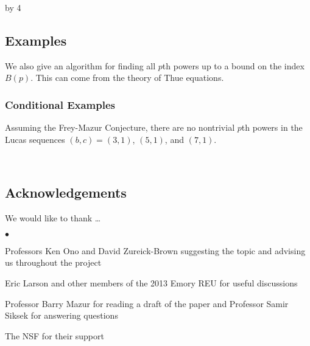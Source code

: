 \documentclass[12pt]{scrartcl}
\newenvironment{citemize}{
\begin{list}{$\bullet$}{\setlength{\itemsep}{0pt} \setlength{\rightmargin}{0pt} \setlength{\leftmargin}{0.5\labelwidth} \setlength{\topsep}{0pt}}
}{\end{list}}
\def\anzspalten{4}
\newlength{\kastenwidth}
\newenvironment{kasten}{%
  \begin{lrbox}{\dummybox}%
    \begin{minipage}{0.96\linewidth}}%
    {\end{minipage}%
  \end{lrbox}%
  \raisebox{-\depth}{\psshadowbox[framesep=1em]{\usebox{\dummybox}}}\\[0.5em]}
\newenvironment{spalte}{%
  \setlength\kastenwidth{1.2\textwidth}
  \divide\kastenwidth by \anzspalten
  \begin{minipage}[t]{\kastenwidth}}{\end{minipage}\hfill}
\begin{document}
\begin{lrbox}{\spalten}
{\begin{spalte}
\begin{kasten}
  \subsection*{{\color{blue} \large Examples}}


We also give an algorithm for finding all $p$th powers up to a bound on the index $B(p)$.  This can come from the theory of Thue equations.



\subsubsection*{\color{red} Conditional Examples}

Assuming the Frey-Mazur Conjecture, there are no nontrivial $p$th powers in the Lucas sequences $(b,c) = (3,1)$, $(5,1)$, and $(7,1)$.

\end{kasten}


\begin{kasten}
\subsection*{{\color{blue} Acknowledgements}}
We would like to thank \ldots
\begin{citemize}
\item Professors Ken Ono and David Zureick-Brown suggesting the topic and advising us throughout the project

\item Eric Larson and other members of the 2013 Emory REU for useful discussions

\item Professor Barry Mazur for reading a draft of the paper and Professor Samir Siksek for answering questions

\item The NSF for their support
\end{citemize}
\end{kasten}


\end{spalte}}
\end{lrbox}
\end{document}
